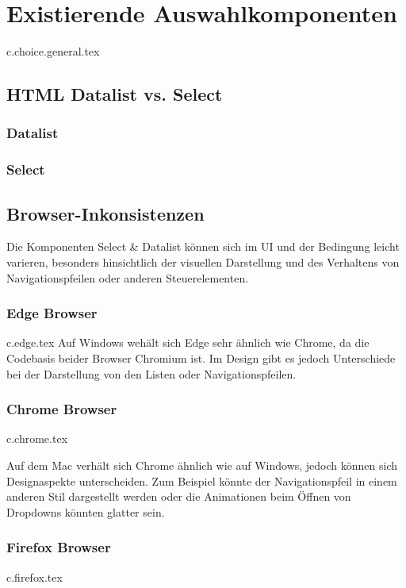 \chapter{Existierende Auswahlkomponenten}

{c.choice.general.tex}


\section{HTML Datalist vs. Select}

\subsection{Datalist}


\subsection{Select}




\section{Browser-Inkonsistenzen}
Die Komponenten Select \& Datalist können sich im UI und der Bedingung leicht varieren,
besonders hinsichtlich der visuellen Darstellung und des Verhaltens von Navigationspfeilen oder anderen Steuerelementen.

\clearpage
\subsection{Edge Browser}
{c.edge.tex}
Auf Windows wehält sich Edge sehr ähnlich wie Chrome, da die Codebasis beider Browser Chromium ist.
Im Design gibt es jedoch Unterschiede bei der Darstellung von den Listen oder Navigationspfeilen. 

\clearpage
\subsection{Chrome Browser}
{c.chrome.tex}

Auf dem Mac verhält sich Chrome ähnlich wie auf Windows, jedoch können sich Designaspekte unterscheiden. 
Zum Beispiel könnte der Navigationspfeil in einem anderen Stil dargestellt werden oder 
die Animationen beim Öffnen von Dropdowns könnten glatter sein.

\clearpage
\subsection{Firefox Browser}
{c.firefox.tex}

